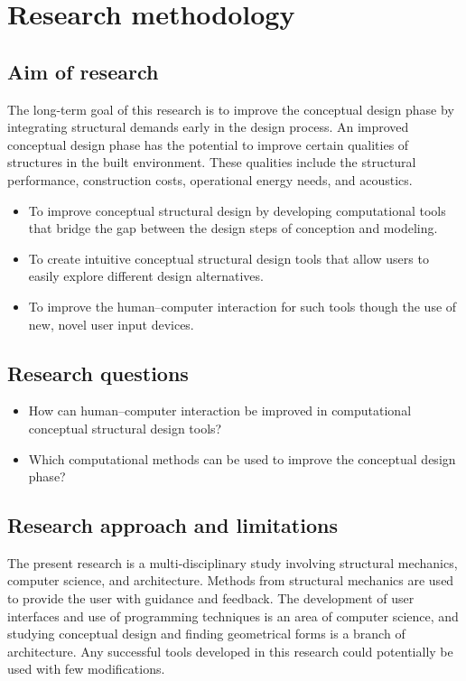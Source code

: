\section{Research methodology }
\subsection{Aim of research}
The long-term goal of this research is to improve the conceptual design phase by integrating structural demands early in the design process. An improved conceptual design phase has the potential to improve certain qualities of structures in the built environment. These qualities include the structural performance, construction costs, operational energy needs, and acoustics.


\begin{itemize}  
\item To improve conceptual structural design by developing computational tools that bridge the gap between the design steps of conception and modeling.
\item  To create intuitive conceptual structural design tools that allow users to easily explore different design alternatives.
\item To improve the human--computer interaction for such tools though the use of new, novel user input devices. 
\end{itemize}


\subsection{Research questions}
\begin{itemize}  
\item How can human--computer interaction be improved in computational conceptual structural design tools?
\item  Which computational methods can be used to improve the conceptual design phase? 
\end{itemize}

\subsection{Research approach and limitations}
The present research is a multi-disciplinary study involving structural mechanics, computer science, and architecture. Methods from structural mechanics are used to provide the user with guidance and feedback. The development of user interfaces and use of programming techniques is an area of computer science, and studying conceptual design and finding geometrical forms is a branch of architecture. Any successful tools developed in this research could potentially be used with few modifications.

